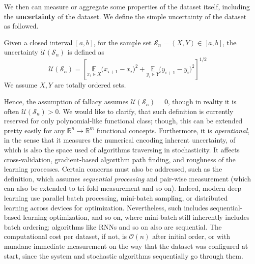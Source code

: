 \documentclass[
  journal=largetwo,
  year=2025,
  volume=37,
]{cup-journal}
\begin{document}
We then can measure or aggregate some properties of the dataset itself, including the \textbf{uncertainty} of the dataset. We define the simple uncertainty of the dataset as followed. 

\begin{definition}
    Given a closed interval $[a,b]$, for the sample set $\mathcal{S}_{n}=(X,Y)\in [a,b]$, the uncertainty $\mathcal{U}(\mathcal{S}_{n})$ is defined as 
    \begin{equation}
        \mathcal{U}(\mathcal{S}_{n}) = \left[ \underset{x_{i}\in X}{\mathbb{E}}\Big( x_{i+1} - x_{i} \Big)^{2} + \underset{y_{i}\in Y}{\mathbb{E}} \Big( y_{i+1}- y_{i} \Big)^{2} \right]^{1/2}
    \end{equation}
    We assume $X,Y$ are totally ordered sets. 
\end{definition}

Hence, the assumption of fallacy assumes $\mathcal{U}(\mathcal{S}_{n})=0$, though in reality it is often $\mathcal{U}(\mathcal{S}_{n})>0$. We would like to clarify, that such definition is currently reserved for only polynomial-like functional class; though, this can be extended pretty easily for any $\mathbb{R}^{n}\to\mathbb{R}^{m}$ functional concepts. Furthermore, it is \textit{operational}, in the sense that it measures the numerical encoding inherent uncertainty, of which is also the space used of algorithms traversing in stochasticity. It affects cross-validation, gradient-based algorithm path finding, and roughness of the learning processes. Certain concerns must also be addressed, such as the definition, which assumes \textit{sequential processing} and pair-wise measurement (which can also be extended to tri-fold measurement and so on). Indeed, modern deep learning use parallel batch processing, mini-batch sampling, or distributed learning across devices for optimization. Nevertheless, such includes sequential-based learning optimization, and so on, where mini-batch still inherently includes batch ordering; algorithms like RNNs and so on also are sequential. The computational cost per dataset, if not, is $\mathcal{O}(n)$ after initial order, or with mundane immediate measurement on the way that the dataset was configured at start, since the system and stochastic algorithms sequentially go through them.
\end{document}
